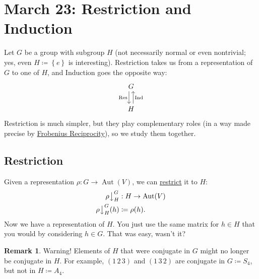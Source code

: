 \documentclass[12pt]{article}
\newcommand\setb[1]{\left \{ #1 \right \}}
\theoremstyle{definition}
\newtheorem*{remark}{Remark}
\DeclareMathOperator\Aut{Aut}
\begin{document}
\section{March 23: Restriction and Induction}
Let $G$ be a group with subgroup $H$ (not necessarily normal or even nontrivial; yes, even $H \coloneqq  \setb{e}$ is interesting). Restriction takes us from a representation of $G$ to one of $H$, and Induction goes the opposite way:
\begin{equation}
    \begin{tikzcd}
        G \arrow[d,xshift=-0.7ex,"\text{Res}"'] \\
        H \arrow[u,xshift=0.7ex, "\text{Ind}"']
    \end{tikzcd}
\end{equation}
Restriction is much simpler, but they play complementary roles (in a way made precise by \underline{Frobenius Reciprocity}), so we study them together.
\subsection{Restriction}
Given a representation $\rho : G \to \Aut(V)$, we can \underline{restrict} it to $H$:
\begin{equation}
    \begin{split}
        \rho \big\downarrow_H^G & : H \to \Aut(V) \\
        \rho \big\downarrow_H^G(h) & \coloneqq  \rho(h).
    \end{split}
\end{equation}
Now we have a representation of $H$. You just use the same matrix for $h \in H$ that you would by considering $h \in G$. That was easy, wasn't it?
\begin{remark}
    Warning! Elements of $H$ that were conjugate in $G$ might no longer be conjugate in $H$. For example, $(1\,2\,3)$ and $(1\,3\,2)$ are conjugate in $G \coloneqq  S_4$, but not in $H \coloneqq  A_4$.
\end{remark}
\end{document}

